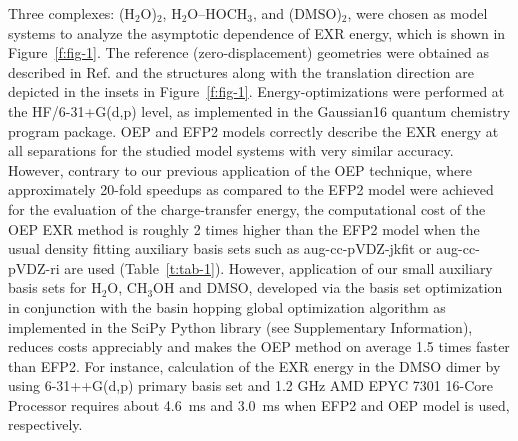 Three complexes: 
(H$_2$O)$_2$, 
H$_2$O--HOCH$_3$, and
(DMSO)$_2$,
were chosen as model systems to analyze the asymptotic dependence 
of EXR energy, which is shown in Figure~\ref{f:fig-1}. 
The reference (zero\hyp{}displacement) geometries
were obtained as described in Ref.\cite{Blasiak.Bednarska.Choluj.Bartkowiak.JCP.2019} 
and the structures  
along with the translation direction are depicted
in the insets in Figure~\ref{f:fig-1}.
Energy\hyp{}optimizations were performed at the HF/6-31+G(d,p) level,
as implemented in 
the {\sc Gaussian16} quantum chemistry program package.\cite{Gaussian16}
OEP and EFP2 models correctly describe the EXR energy at all separations
for the studied model systems with very similar accuracy. 
However,
contrary to our previous application of the OEP technique\cite{Blasiak.Bednarska.Choluj.Bartkowiak.JCP.2019},
where approximately 20\hyp{}fold speedups as compared to the EFP2 model were achieved
for the evaluation of the charge\hyp{}transfer energy,
the computational cost of the OEP EXR method is roughly 2 times higher than the EFP2 model
when the usual density fitting auxiliary basis sets such as aug-cc-pVDZ-jkfit or aug-cc-pVDZ-ri are used
(Table~\ref{t:tab-1}).
However, application of our small auxiliary basis sets for H$_2$O, CH$_3$OH and DMSO, 
developed via the basis set optimization~\cite{Blasiak.Bednarska.Choluj.Bartkowiak.JCP.2019}
in conjunction with the basin hopping global optimization algorithm  %
as implemented in the SciPy Python library
(see Supplementary Information),
reduces costs appreciably and makes the OEP method on average 1.5 times faster than EFP2.
For instance, calculation of the EXR energy in the DMSO dimer by using 6-31++G(d,p) primary
basis set and 
1.2 GHz AMD EPYC\texttrademark{} 7301 16-Core Processor
requires about 4.6~ms and 3.0~ms when EFP2 and OEP model is used, respectively.

